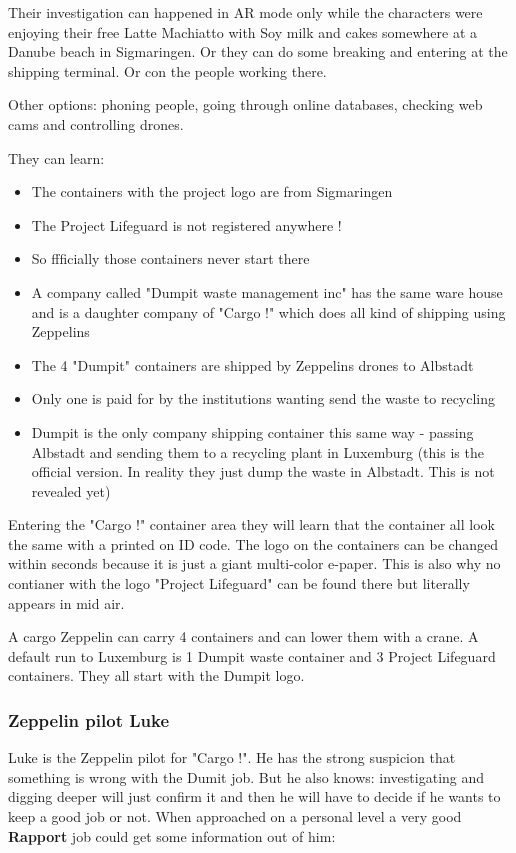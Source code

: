 Their investigation can happened in AR mode only while the characters were enjoying their free Latte Machiatto with Soy milk and cakes somewhere at a Danube beach in Sigmaringen. Or they can do some breaking and entering at the shipping terminal. Or con the people working there.

Other options: phoning people, going through online databases, checking web cams and controlling drones.

They can learn:

\begin{itemize}
    \item The containers with the project logo are from Sigmaringen
    \item The Project Lifeguard is not registered anywhere !
    \item So ffficially those containers never start there
    \item A company called "Dumpit waste management inc" has the same ware house and is a daughter company of "Cargo !" which does all kind of shipping using Zeppelins
    \item The 4 "Dumpit" containers are shipped by Zeppelins drones to Albstadt
    \item Only one is paid for by the institutions wanting send the waste to recycling
    \item Dumpit is the only company shipping container this same way - passing Albstadt and sending them to a recycling plant in Luxemburg (this is the official version. In reality they just dump the waste in Albstadt. This is not revealed yet)
\end{itemize}

Entering the "Cargo !" container area they will learn that the container all look the same with a printed on ID code. The logo on the containers can be changed within seconds because it is just a giant multi-color e-paper. This is also why no contianer with the logo "Project Lifeguard" can be found there but literally appears in mid air.

A cargo Zeppelin can carry 4 containers and can lower them with a crane. A default run to Luxemburg is 1 Dumpit waste container and 3 Project Lifeguard containers. They all start with the Dumpit logo.

\subsubsection{Zeppelin pilot Luke}

Luke is the Zeppelin pilot for "Cargo !". He has the strong suspicion that something is wrong with the Dumit job. But he also knows: investigating and digging deeper will just confirm it and then he will have to decide if he wants to keep a good job or not. When approached on a personal level a very good \textbf{Rapport} job could get some information out of him:

